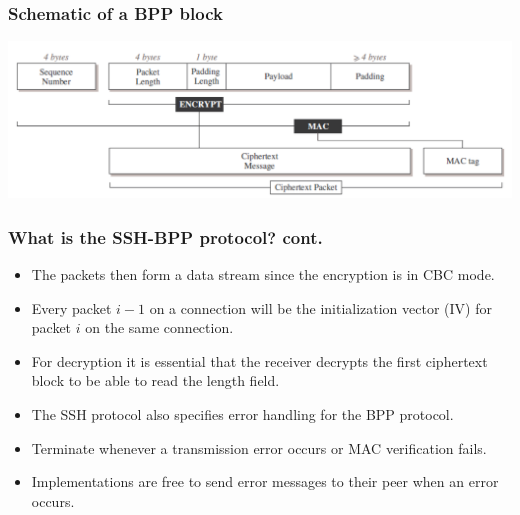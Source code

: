 \documentclass[fleqn]{beamer}
\begin{document}
  \begin{frame}
    \frametitle{Schematic of a BPP block}
    \begin{center}
    \includegraphics[scale=.4]{SSHBPP.pdf}
    \end{center}
  \end{frame}

  \begin{frame}
    \frametitle{What is the SSH-BPP protocol? cont.}
	\begin{itemize}
	\item The packets then form a data stream since the encryption is in CBC mode. 
	\item Every packet $i-1$ on a connection will be the initialization vector (IV) for packet $i$ on the same connection.
	\item For decryption it is essential that the receiver decrypts the first ciphertext block to be able to read the length field.
	\item The SSH protocol also specifies error handling for the BPP protocol. 
	\item Terminate whenever a transmission error occurs or MAC verification fails. 
	\item Implementations are free to send error messages to their peer when an error occurs.
	\end{itemize}
  \end{frame}
  
\end{document}
